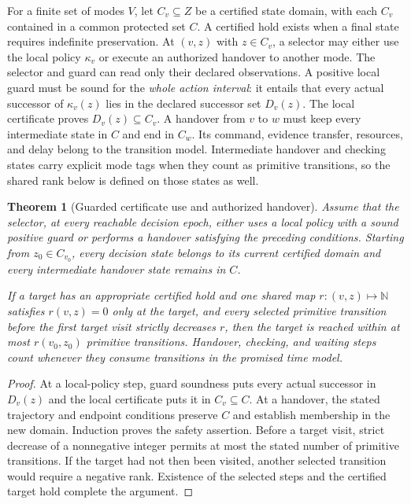 \documentclass[11pt,letterpaper]{article}
\theoremstyle{plain}
\newtheorem{theorem}[proposition]{Theorem}
\theoremstyle{definition}
\theoremstyle{remark}
\begin{document}
For a finite set of modes $V$, let $C_v\subseteq Z$ be a certified state domain, with each $C_v$ contained in a common protected set $C$. A certified hold exists when a final state requires indefinite preservation. At $(v,z)$ with $z\in C_v$, a selector may either use the local policy $\kappa_v$ or execute an authorized handover to another mode. The selector and guard can read only their declared observations. A positive local guard must be sound for the \emph{whole action interval}: it entails that every actual successor of $\kappa_v(z)$ lies in the declared successor set $D_v(z)$. The local certificate proves $D_v(z)\subseteq C_v$. A handover from $v$ to $w$ must keep every intermediate state in $C$ and end in $C_w$. Its command, evidence transfer, resources, and delay belong to the transition model. Intermediate handover and checking states carry explicit mode tags when they count as primitive transitions, so the shared rank below is defined on those states as well.

\begin{theorem}[Guarded certificate use and authorized handover]\label{thm:guarded-certificates}
Assume that the selector, at every reachable decision epoch, either uses a local policy with a sound positive guard or performs a handover satisfying the preceding conditions. Starting from $z_0\in C_{v_0}$, every decision state belongs to its current certified domain and every intermediate handover state remains in $C$.

If a target has an appropriate certified hold and one shared map $r:(v,z)\mapsto\mathbb N$ satisfies $r(v,z)=0$ only at the target, and every selected primitive transition before the first target visit strictly decreases $r$, then the target is reached within at most $r(v_0,z_0)$ primitive transitions. Handover, checking, and waiting steps count whenever they consume transitions in the promised time model.
\end{theorem}
\begin{proof}
At a local-policy step, guard soundness puts every actual successor in $D_v(z)$ and the local certificate puts it in $C_v\subseteq C$. At a handover, the stated trajectory and endpoint conditions preserve $C$ and establish membership in the new domain. Induction proves the safety assertion. Before a target visit, strict decrease of a nonnegative integer permits at most the stated number of primitive transitions. If the target had not then been visited, another selected transition would require a negative rank. Existence of the selected steps and the certified target hold complete the argument.
\end{proof}
\end{document}
